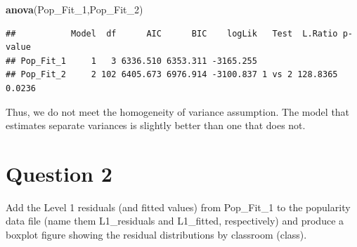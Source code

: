 \documentclass[]{article}
\newenvironment{Shaded}{\begin{snugshade}}{\end{snugshade}}
\newcommand{\KeywordTok}[1]{\textcolor[rgb]{0.13,0.29,0.53}{\textbf{#1}}}
\newcommand{\DecValTok}[1]{\textcolor[rgb]{0.00,0.00,0.81}{#1}}
\newcommand{\NormalTok}[1]{#1}
\begin{document}
\begin{Shaded}
\begin{Highlighting}[]
\KeywordTok{anova}\NormalTok{(Pop_Fit_}\DecValTok{1}\NormalTok{,Pop_Fit_}\DecValTok{2}\NormalTok{)}
\end{Highlighting}
\end{Shaded}

\begin{verbatim}
##           Model  df      AIC      BIC    logLik   Test  L.Ratio p-value
## Pop_Fit_1     1   3 6336.510 6353.311 -3165.255                        
## Pop_Fit_2     2 102 6405.673 6976.914 -3100.837 1 vs 2 128.8365  0.0236
\end{verbatim}

Thus, we do not meet the homogeneity of variance assumption. The model
that estimates separate variances is slightly better than one that does
not.

\section{Question 2}\label{question-2}

Add the Level 1 residuals (and fitted values) from Pop\_Fit\_1 to the
popularity data file (name them L1\_residuals and L1\_fitted,
respectively) and produce a boxplot figure showing the residual
distributions by classroom (class).
\end{document}
